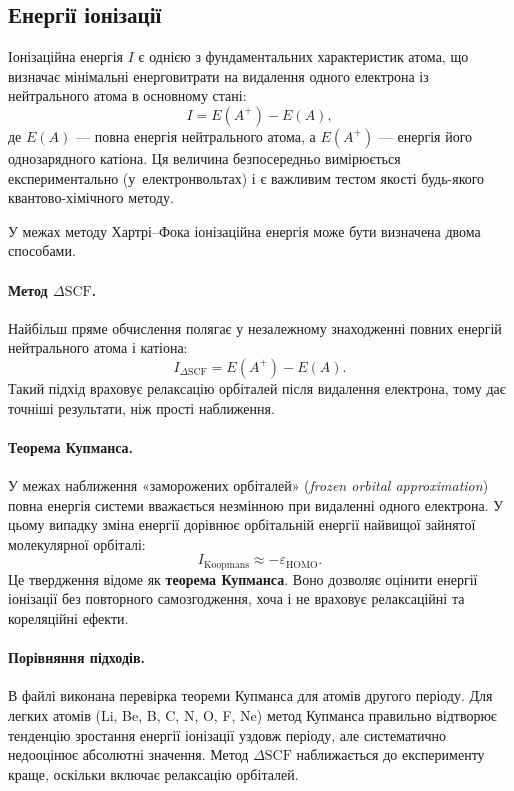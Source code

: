 \subsection{Енергії іонізації}\label{sec:Koopmans}

Іонізаційна енергія \(I\) є однією з фундаментальних характеристик атома, що визначає мінімальні енерговитрати на видалення одного електрона із нейтрального атома в основному стані:
\[
I = E(A^+) - E(A),
\]
де \(E(A)\) — повна енергія нейтрального атома, а \(E(A^+)\) — енергія його однозарядного катіона.
Ця величина безпосередньо вимірюється експериментально (у~електронвольтах) і є важливим тестом якості будь-якого квантово-хімічного методу.

У межах методу Хартрі–Фока іонізаційна енергія може бути визначена двома способами.

\paragraph{Метод \(\Delta\mathrm{SCF}\).}
Найбільш пряме обчислення полягає у незалежному знаходженні повних енергій нейтрального атома і катіона:
\[
I_{\Delta\mathrm{SCF}} = E(A^+) - E(A).
\]
Такий підхід враховує релаксацію орбіталей після видалення електрона, тому дає точніші результати, ніж прості наближення.

\paragraph{Теорема Купманса.}
У межах наближення «заморожених орбіталей» (\textit{frozen orbital approximation})
повна енергія системи вважається незмінною при видаленні одного електрона.
У цьому випадку зміна енергії дорівнює орбітальній енергії найвищої зайнятої молекулярної орбіталі:
\[
I_\mathrm{Koopmans} \approx -\varepsilon_\mathrm{HOMO}.
\]
Це твердження відоме як \textbf{теорема Купманса}.
Воно дозволяє оцінити енергії іонізації без повторного самозгодження, хоча і не враховує релаксаційні та кореляційні ефекти.

\paragraph{Порівняння підходів.}
В файлі   виконана перевірка теореми Купманса для атомів другого періоду.
Для легких атомів (Li, Be, B, C, N, O, F, Ne) метод Купманса правильно відтворює тенденцію зростання енергії іонізації уздовж періоду, але систематично недооцінює абсолютні значення.
Метод \(\Delta\mathrm{SCF}\) наближається до експерименту краще, оскільки включає релаксацію орбіталей.

